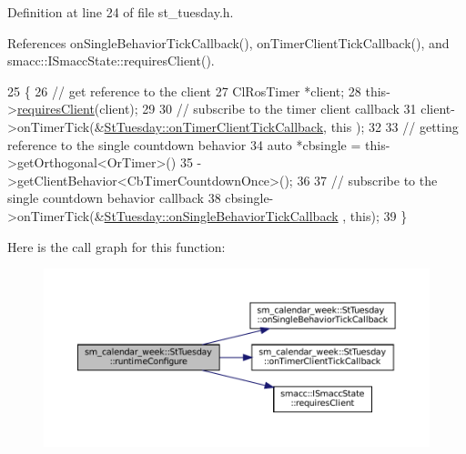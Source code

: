 Definition at line 24 of file st\+\_\+tuesday.\+h.



References on\+Single\+Behavior\+Tick\+Callback(), on\+Timer\+Client\+Tick\+Callback(), and smacc\+::\+I\+Smacc\+State\+::requires\+Client().


\begin{DoxyCode}
25     \{
26         \textcolor{comment}{// get reference to the client}
27         ClRosTimer *client;
28         this->\hyperlink{classsmacc_1_1ISmaccState_a7f95c9f0a6ea2d6f18d1aec0519de4ac}{requiresClient}(client);
29 
30         \textcolor{comment}{// subscribe to the timer client callback}
31         client->onTimerTick(&\hyperlink{structsm__calendar__week_1_1StTuesday_a7d8597c9f4fae517b37147b90c49fb3c}{StTuesday::onTimerClientTickCallback}, \textcolor{keyword}{this}
      );
32 
33         \textcolor{comment}{// getting reference to the single countdown behavior}
34         \textcolor{keyword}{auto} *cbsingle = this->getOrthogonal<OrTimer>()
35                              ->getClientBehavior<CbTimerCountdownOnce>();
36 
37         \textcolor{comment}{// subscribe to the single countdown behavior callback}
38         cbsingle->onTimerTick(&\hyperlink{structsm__calendar__week_1_1StTuesday_ac8fe86e252d56ac6900b521e010aa8c8}{StTuesday::onSingleBehaviorTickCallback}
      , \textcolor{keyword}{this});
39     \}
\end{DoxyCode}
Here is the call graph for this function\+:
\nopagebreak
\begin{figure}[H]
\begin{center}
\leavevmode
\includegraphics[width=350pt]{structsm__calendar__week_1_1StTuesday_a1980a60ba5b27efea0cca5746694985f_cgraph}
\end{center}
\end{figure}
\mbox{\label{structsm__calendar__week_1_1StTuesday_a1d0e3568187fa9cfd3181e2c951e8856}} 
